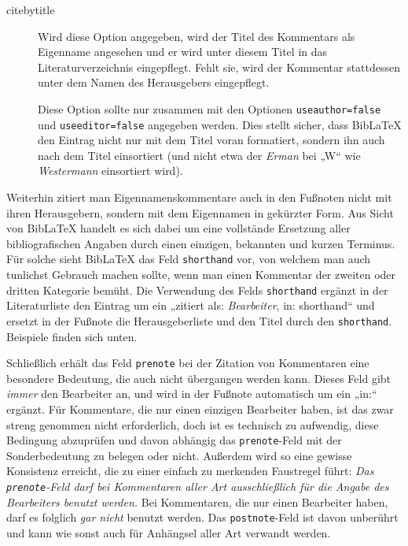 \documentclass[11pt,a4paper,DIV=calc]{scrartcl}
\newcommand\software[1]{\textsf{#1}}
\newcommand\Biblatex{\software{Bib\LaTeX{}}\xspace}
\newcommand\name[1]{\textit{#1}}
\begin{document}
\begin{description}
\item[citebytitle] Wird diese Option angegeben, wird der Titel des
  Kommentars als Eigenname angesehen und er wird unter diesem Titel in
  das Literaturverzeichnis eingepflegt. Fehlt sie, wird der Kommentar
  stattdessen unter dem Namen des Herausgebers eingepflegt.

  Diese Option sollte nur zusammen mit den Optionen
  \verb+useauthor=false+ und \verb+useeditor=false+ angegeben
  werden. Dies stellt sicher, dass \Biblatex den Eintrag nicht nur mit
  dem Titel voran formatiert, sondern ihn auch nach dem Titel
  einsortiert (und nicht etwa der \name{Erman} bei „W“ wie
  \name{Westermann} einsortiert wird).
\end{description}

Weiterhin zitiert man Eigennamenskommentare auch in den Fußnoten nicht
mit ihren Herausgebern, sondern mit dem Eigennamen in gekürzter
Form. Aus Sicht von \Biblatex handelt es sich dabei um eine vollstände
Ersetzung aller bibliografischen Angaben durch einen einzigen,
bekannten und kurzen Terminus. Für solche sieht \Biblatex das Feld
\verb+shorthand+ vor, von welchem man auch tunlichst Gebrauch machen
sollte, wenn man einen Kommentar der zweiten oder dritten Kategorie
bemüht. Die Verwendung des Felds \verb+shorthand+ ergänzt in der
Literaturliste den Eintrag um ein „zitiert als: \name{Bearbeiter}, in:
shorthand“ und ersetzt in der Fußnote die Herausgeberliste und den
Titel durch den \verb+shorthand+. Beispiele finden sich unten.

Schließlich erhält das Feld \verb+prenote+ bei der Zitation von
Kommentaren eine besondere Bedeutung, die auch nicht übergangen werden
kann. Dieses Feld gibt \emph{immer} den Bearbeiter an, und wird in der
Fußnote automatisch um ein „in:“ ergänzt. Für Kommentare, die nur
einen einzigen Bearbeiter haben, ist das zwar streng genommen nicht
erforderlich, doch ist es technisch zu aufwendig, diese Bedingung
abzuprüfen und davon abhängig das \verb+prenote+-Feld mit der
Sonderbedeutung zu belegen oder nicht. Außerdem wird so eine gewisse
Konsistenz erreicht, die zu einer einfach zu merkenden Faustregel
führt: \emph{Das \texttt{prenote}-Feld darf bei Kommentaren aller Art
  ausschließlich für die Angabe des Bearbeiters benutzt werden.} Bei
Kommentaren, die nur einen Bearbeiter haben, darf es folglich
\emph{gar nicht} benutzt werden. Das \verb+postnote+-Feld ist davon
unberührt und kann wie sonst auch für Anhängsel aller Art verwandt
werden.
\end{document}
